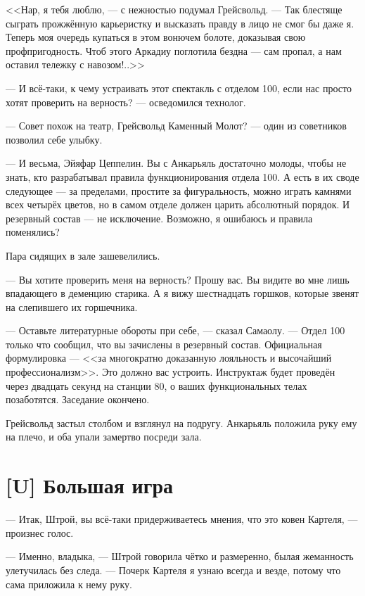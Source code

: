 <<Нар, я тебя люблю, --- с нежностью подумал Грейсвольд.
--- Так блестяще сыграть прожжённую карьеристку и высказать правду в лицо не смог бы даже я.
Теперь моя очередь купаться в этом вонючем болоте, доказывая свою профпригодность.
Чтоб этого Аркадиу поглотила бездна --- сам пропал, а нам оставил тележку с навозом!..>>

--- И всё-таки, к чему устраивать этот спектакль с отделом 100, если нас просто хотят проверить на верность? --- осведомился технолог.

--- Совет похож на театр, Грейсвольд Каменный Молот? --- один из советников позволил себе улыбку.

--- И весьма, Эйяфар Цеппелин.
Вы с Анкарьяль достаточно молоды, чтобы не знать, кто разрабатывал правила функционирования отдела 100.
А есть в их своде следующее --- за пределами, простите за фигуральность, можно играть камнями всех четырёх цветов\FM, но в самом отделе должен царить абсолютный порядок.
И резервный состав --- не исключение.
Возможно, я ошибаюсь и правила поменялись?

Пара сидящих в зале зашевелились.

--- Вы хотите проверить меня на верность?
Прошу вас.
Вы видите во мне лишь впадающего в деменцию старика.
А я вижу шестнадцать горшков, которые звенят на слепившего их горшечника.

--- Оставьте литературные обороты при себе, --- сказал Самаолу.
--- Отдел 100 только что сообщил, что вы зачислены в резервный состав.
Официальная формулировка --- <<за многократно доказанную лояльность и высочайший профессионализм>>.
Это должно вас устроить.
Инструктаж будет проведён через двадцать секунд на станции 80, о ваших функциональных телах позаботятся.
Заседание окончено.

Грейсвольд застыл столбом и взглянул на подругу.
Анкарьяль положила руку ему на плечо, и оба упали замертво посреди зала.

\section{[U] Большая игра}

\textspace

--- Итак, Штрой, вы всё-таки придерживаетесь мнения, что это ковен Картеля, --- произнес голос.

--- Именно, владыка, --- Штрой говорила чётко и размеренно, былая жеманность улетучилась без следа.
--- Почерк Картеля я узнаю всегда и везде, потому что сама приложила к нему руку.

